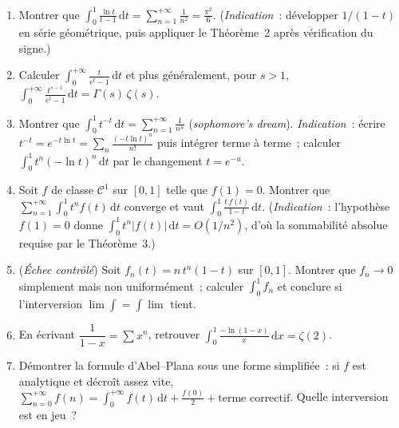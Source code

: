 \begin{mdframed}[style=exobar]
  \begin{enumerate}
    \item Montrer que $\displaystyle\int_0^1\frac{\ln t}{t-1}\,\mathrm{d}t
          = \sum_{n=1}^{+\infty}\frac{1}{n^2} = \frac{\pi^2}{6}$.
          (\textit{Indication}~: développer $1/(1-t)$ en série
          géométrique, puis appliquer le Théorème~2 après vérification
          du signe.)

    \item Calculer $\displaystyle\int_0^{+\infty}\frac{t}{e^t-1}\,\mathrm{d}t$
          et plus généralement, pour $s>1$,
          $\displaystyle\int_0^{+\infty}\frac{t^{s-1}}{e^t-1}\,\mathrm{d}t
          = \Gamma(s)\,\zeta(s)$.

    \item Montrer que $\displaystyle\int_0^1 t^{-t}\,\mathrm{d}t
          = \sum_{n=1}^{+\infty}\frac{1}{n^n}$
          (\emph{sophomore's dream}). \textit{Indication}~: écrire
          $t^{-t} = e^{-t\ln t} = \sum_n \frac{{(-t\ln t)}^n}{n!}$ puis
          intégrer terme à terme~; calculer $\int_0^1 t^n(-\ln t)^n\,\mathrm{d}t$
          par le changement $t = e^{-u}$.

    \item Soit $f$ de classe $\mathcal{C}^1$ sur $[0,1]$ telle que $f(1)=0$.
          Montrer que $\displaystyle\sum_{n=1}^{+\infty}\int_0^1 t^n f(t)\,\mathrm{d}t$
          converge et vaut $\displaystyle\int_0^1 \frac{t\,f(t)}{1-t}\,\mathrm{d}t$.
          (\textit{Indication}~: l'hypothèse $f(1)=0$ donne
          $\int_0^1 t^n |f(t)|\,\mathrm{d}t = O(1/n^2)$, d'où la sommabilité
          absolue requise par le Théorème~3.)

    \item (\textit{Échec contrôlé}) Soit $f_n(t) = n\,t^n(1-t)$ sur $[0,1]$.
          Montrer que $f_n \to 0$ simplement mais non uniformément~;
          calculer $\int_0^1 f_n$ et conclure si l'interversion
          $\lim\int = \int\lim$ tient.

    \item En écrivant $\dfrac{1}{1-x} = \sum x^n$, retrouver
          $\displaystyle\int_0^1 \frac{-\ln(1-x)}{x}\,\mathrm{d}x = \zeta(2)$.

    \item Démontrer la formule d'Abel--Plana sous une forme simplifiée~:
          si $f$ est analytique et décroît assez vite,
          $\displaystyle\sum_{n=0}^{+\infty} f(n) = \int_0^{+\infty} f(t)\,\mathrm{d}t
          + \frac{f(0)}{2} + \text{terme correctif}$. Quelle interversion
          est en jeu~?
  \end{enumerate}
\end{mdframed}

